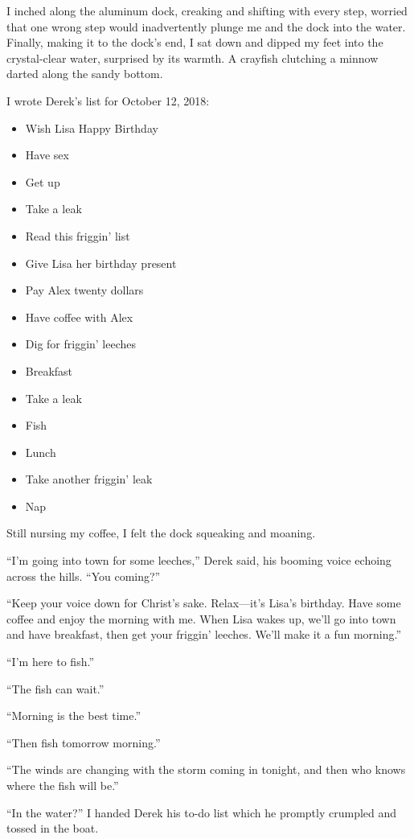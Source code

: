 I inched along the aluminum dock, creaking and shifting with every step,
worried that one wrong step would inadvertently plunge me and the dock
into the water. Finally, making it to the dock's end, I sat down and
dipped my feet into the crystal-clear water, surprised by its warmth. A
crayfish clutching a minnow darted along the sandy bottom.

I wrote Derek's list for October 12, 2018:

\begin{itemize}
\tightlist
\item
  Wish Lisa Happy Birthday
\item
  Have sex
\item
  Get up
\item
  Take a leak
\item
  Read this friggin' list
\item
  Give Lisa her birthday present
\item
  Pay Alex twenty dollars
\item
  Have coffee with Alex
\item
  Dig for friggin' leeches
\item
  Breakfast
\item
  Take a leak
\item
  Fish
\item
  Lunch
\item
  Take another friggin' leak
\item
  Nap
\end{itemize}

Still nursing my coffee, I felt the dock squeaking and moaning.

``I'm going into town for some leeches,'' Derek said, his booming voice
echoing across the hills. ``You coming?''

``Keep your voice down for Christ's sake. Relax---it's Lisa's birthday.
Have some coffee and enjoy the morning with me. When Lisa wakes up,
we'll go into town and have breakfast, then get your friggin' leeches.
We'll make it a fun morning.''

``I'm here to fish.''

``The fish can wait.''

``Morning is the best time.''

``Then fish tomorrow morning.''

``The winds are changing with the storm coming in tonight, and then who
knows where the fish will be.''

``In the water?'' I handed Derek his to-do list which he promptly
crumpled and tossed in the boat.

